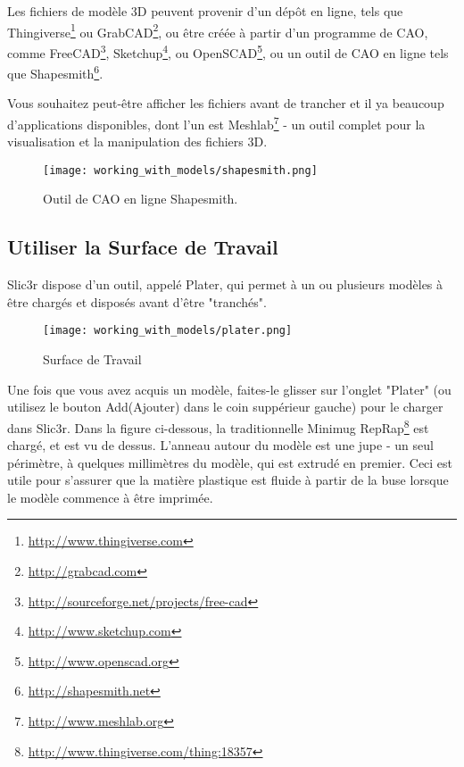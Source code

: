 Les fichiers de mod\`ele 3D peuvent provenir d'un d\'ep\^ot en ligne, tels que Thingiverse\footnote{\url{http://www.thingiverse.com}} ou GrabCAD\footnote{\url{http://grabcad.com}}, ou \^etre cr\'e\'ee \`a partir d'un programme de CAO, comme FreeCAD\footnote{\url{http://sourceforge.net/projects/free-cad}}, Sketchup\footnote{\url{http://www.sketchup.com}}, ou OpenSCAD\footnote{\url{http://www.openscad.org}}, ou un outil de CAO en ligne tels que Shapesmith\footnote{\url{http://shapesmith.net}}.

Vous souhaitez peut-\^etre afficher les fichiers avant de trancher et il ya beaucoup d'applications disponibles, dont l'un est Meshlab\footnote{\url{http://www.meshlab.org}} - un outil complet pour la visualisation et la manipulation des fichiers 3D.

\begin{figure}[H]
\centering
\texttt{[image: working\_with\_models/shapesmith.png]}
\caption{Outil de CAO en ligne Shapesmith.}
\label{fig:shapesmith}
\end{figure}



\subsection{Utiliser la Surface de Travail} %
\label{sub:working_with_plater}
Slic3r dispose d'un outil, appel\'e Plater, qui permet \`a un ou plusieurs mod\`eles \`a \^etre charg\'es et dispos\'es avant d'\^etre "tranch\'es".

\begin{figure}[H]
\centering
\texttt{[image: working\_with\_models/plater.png]}
\caption{Surface de Travail}
\label{fig:plater}
\end{figure}


Une fois que vous avez acquis un mod\`ele, faites-le glisser sur l'onglet "Plater" (ou utilisez le bouton Add(Ajouter) dans le coin supp\'erieur gauche) pour le charger dans Slic3r. Dans la figure ci-dessous, la traditionnelle Minimug RepRap\footnote{\url{http://www.thingiverse.com/thing:18357}} est chargé, et est vu de dessus. L'anneau autour du modèle est une jupe - un seul périmètre, à quelques millimètres du modèle, qui est extrudé en premier. Ceci est utile pour s'assurer que la matière plastique est fluide à partir de la buse lorsque le modèle commence à être imprimée.

